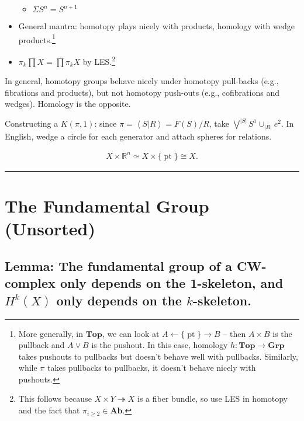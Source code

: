 \begin{itemize}
  \begin{itemize}
  \tightlist
  \item
    \(\Sigma S^n = S^{n+1}\)
  \end{itemize}
\item
  General mantra: homotopy plays nicely with products, homology with
  wedge products.\footnote{More generally, in \(\mathbf{Top}\), we can
    look at \(A \leftarrow{\{\operatorname{pt}\}}\to B\) -- then
    \(A\times B\) is the pullback and \(A \vee B\) is the pushout. In
    this case, homology \(h: \mathbf{Top} \to \mathbf{Grp}\) takes
    pushouts to pullbacks but doesn't behave well with pullbacks.
    Similarly, while \(\pi\) takes pullbacks to pullbacks, it doesn't
    behave nicely with pushouts.}
\item
  \(\pi_k\prod X = \prod \pi_k X\) by LES.\footnote{This follows because
    \(X\times Y \twoheadrightarrow X\) is a fiber bundle, so use LES in
    homotopy and the fact that \(\pi_{i\geq 2} \in \mathbf{Ab}\).}
\end{itemize}

In general, homotopy groups behave nicely under homotopy pull-backs
(e.g., fibrations and products), but not homotopy push-outs (e.g.,
cofibrations and wedges). Homology is the opposite.

Constructing a \(K(\pi, 1)\): since
\(\pi = \left< S \mathrel{\Big|}R\right> = F(S)/R\), take
\(\bigvee^{|S|} S^1 \cup_{|R|} e^2\). In English, wedge a circle for
each generator and attach spheres for relations.

\begin{proposition}

\begin{align*}
X\times{\mathbb{R}}^n \simeq X \times{\{\operatorname{pt}\}}\cong X
.\end{align*}

\end{proposition}

\begin{center}\rule{0.5\linewidth}{0.5pt}\end{center}

\hypertarget{the-fundamental-group-unsorted}{%
\section{The Fundamental Group
(Unsorted)}\label{the-fundamental-group-unsorted}}

\hypertarget{lemma-the-fundamental-group-of-a-cw-complex-only-depends-on-the-1-skeleton-and-hkx-only-depends-on-the-k-skeleton.}{%
\subsection{\texorpdfstring{Lemma: The fundamental group of a CW-complex
only depends on the 1-skeleton, and \(H^k(X)\) only depends on the
\(k\)-skeleton.}{Lemma: The fundamental group of a CW-complex only depends on the 1-skeleton, and H\^{}k(X) only depends on the k-skeleton.}}\label{lemma-the-fundamental-group-of-a-cw-complex-only-depends-on-the-1-skeleton-and-hkx-only-depends-on-the-k-skeleton.}}

